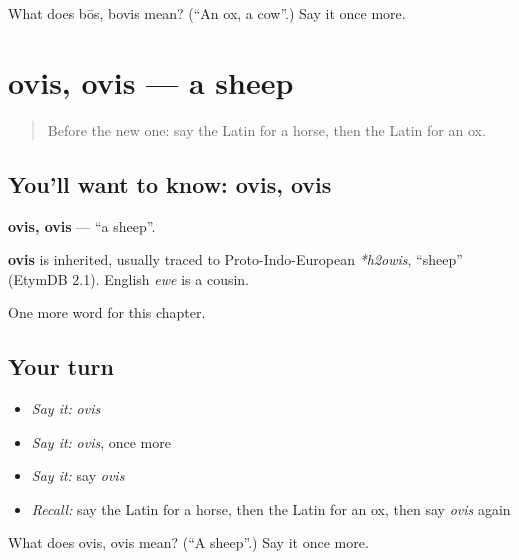 \begin{tcolorbox}[breakable,colback=teal!4,colframe=teal!35!black,title={Before you move on}]
What does bōs, bovis mean? (\textquotedblleft{}An ox, a cow\textquotedblright{}.) Say it once more.
\end{tcolorbox}
\section[ovis, ovis]{ovis, ovis — a sheep}

\label{lesson:LA-C90-ovis}



\begin{quote}
Before the new one: say the Latin for a horse, then the Latin for an ox.
\end{quote}

\subsection*{You'll want to know: ovis, ovis}
\textbf{ovis, ovis} — \textquotedblleft{}a sheep\textquotedblright{}.

\begin{cousinweb}
\textbf{ovis} is inherited, usually traced to Proto-Indo-European \emph{*h2owis}, \textquotedblleft{}sheep\textquotedblright{} (EtymDB 2.1). English \emph{ewe} is a cousin.
\end{cousinweb}

\begin{grammarlens}[title={What you've built}]
One more word for this chapter.
\end{grammarlens}

\subsection*{Your turn}
\begin{itemize}
\raggedright
  \item \emph{Say it:} \emph{ovis}
  \item \emph{Say it:} \emph{ovis}, once more
  \item \emph{Say it:} say \emph{ovis}
  \item \emph{Recall:} say the Latin for a horse, then the Latin for an ox, then say \emph{ovis} again
\end{itemize}

\begin{tcolorbox}[breakable,colback=teal!4,colframe=teal!35!black,title={Before you move on}]
What does ovis, ovis mean? (\textquotedblleft{}A sheep\textquotedblright{}.) Say it once more.
\end{tcolorbox}

